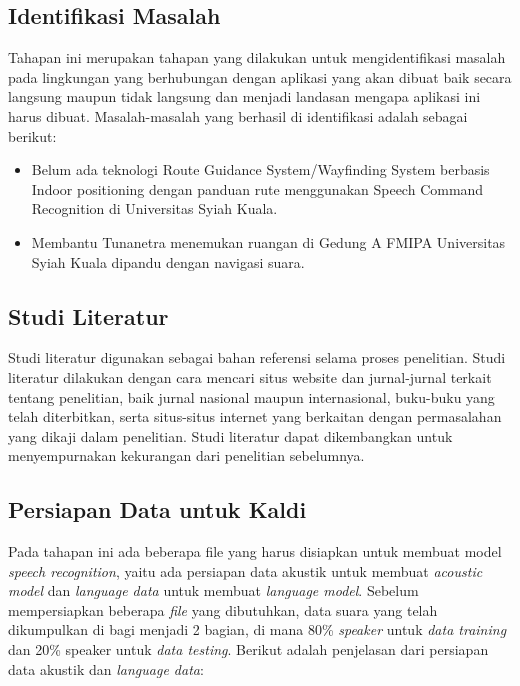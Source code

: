 \subsection{Identifikasi Masalah}
Tahapan ini merupakan tahapan yang dilakukan untuk mengidentifikasi masalah pada lingkungan yang berhubungan dengan aplikasi yang akan dibuat baik secara langsung maupun tidak langsung dan menjadi landasan mengapa aplikasi ini harus dibuat. Masalah-masalah yang berhasil di identifikasi adalah sebagai berikut:

\begin{itemize}
\item Belum ada teknologi Route Guidance System/Wayfinding System berbasis Indoor positioning dengan panduan rute menggunakan Speech Command Recognition di Universitas Syiah Kuala.

\item Membantu Tunanetra menemukan ruangan di Gedung A FMIPA Universitas Syiah Kuala dipandu dengan navigasi suara.

\end{itemize}

\subsection{Studi Literatur}
Studi literatur digunakan sebagai bahan referensi selama proses penelitian. Studi literatur dilakukan dengan cara mencari situs website dan jurnal-jurnal terkait tentang penelitian, baik jurnal nasional maupun internasional, buku-buku yang telah diterbitkan, serta situs-situs internet yang berkaitan dengan permasalahan yang dikaji dalam penelitian. Studi literatur dapat dikembangkan untuk menyempurnakan kekurangan dari penelitian sebelumnya.

\subsection{Persiapan Data untuk Kaldi}
Pada tahapan ini ada beberapa file yang harus disiapkan untuk membuat model \textit{speech recognition}, yaitu ada persiapan data akustik untuk membuat \textit{acoustic model} dan \textit{language data} untuk membuat \textit{language model}. Sebelum mempersiapkan beberapa \textit{file} yang dibutuhkan, data suara yang telah dikumpulkan di bagi menjadi 2 bagian, di mana 80\% \textit{speaker} untuk \textit{data training} dan 20\% speaker untuk \textit{data testing}. Berikut adalah penjelasan dari persiapan data akustik dan \textit{language data}:

